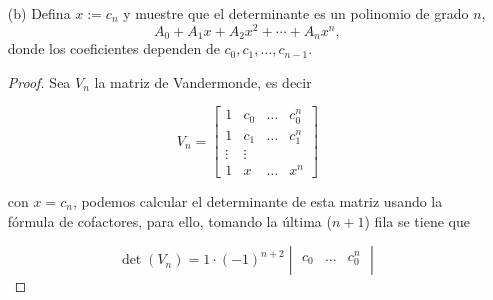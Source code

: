 \documentclass[11pt]{article}
\theoremstyle{definition} %
\begin{document}
\begin{enumerate}
\begin{proof}
\[\begin{bmatrix}
1 & c_0 & c_0^2 \\

0 & 1 & c_1 + c_0 \\

0 & 1 & c_2 + c_0

\end{bmatrix}.
\]

Restando la segunda fila de la tercera para triangularizar completamente

\[
\det(V_2) = (c_1 - c_0)(c_2 - c_0) \det
\begin{bmatrix}

1 & c_0 & c_0^2 \\

0 & 1 & c_1 + c_0 \\

0 & 0 & c_2 - c_1

\end{bmatrix} = (c_1 - c_0)(c_2 - c_0)(c_2 - c_1),
\]

lo que coincide con la fórmula original

\[
\prod_{0 \le j < k \le 2} (c_k - c_j) = (c_1 - c_0)(c_2 - c_0)(c_2 - c_1).
\]

  \end{proof}
  \item[(b)] Defina \(x:=c_n\) y muestre que el determinante es un polinomio de grado \(n\),
  \[
    A_0 + A_1 x + A_2 x^2 + \cdots + A_n x^n,
  \]
  donde los coeficientes dependen de \(c_0,c_1,\dots,c_{n-1}\).
  \begin{proof}
    Sea $V_n$ la matriz de Vandermonde, es decir

\[
V_n = \begin{bmatrix}

    1 & c_0 & \dots & c_0^n \\

    1 & c_1 & \dots & c_1^n \\

    \vdots & \vdots \\

    1 & x & \dots & x^n

\end{bmatrix}
\]

con $x = c_n$, podemos calcular el determinante de esta matriz usando la fórmula de cofactores, para ello, tomando la última ($n+1$) fila se tiene que

\[
\det(V_n)= 1\cdot(-1)^{n+2} \begin{vmatrix}

    c_0 & \dots & c_0^n \\


\end{vmatrix}\]
\end{proof}
\end{enumerate}
\end{document}
